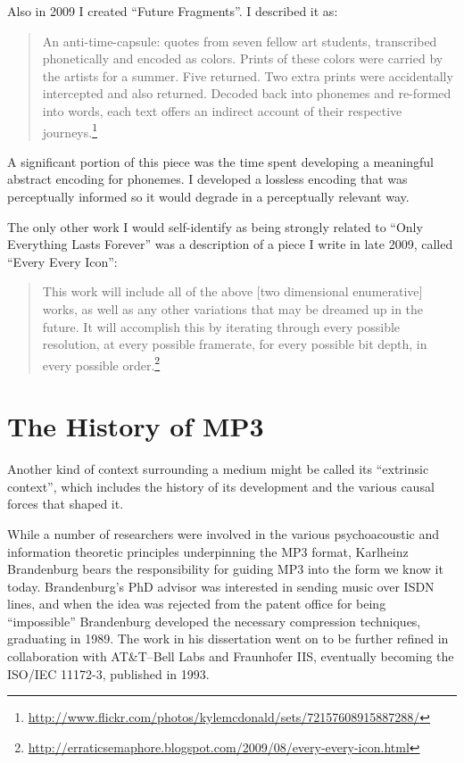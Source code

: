 \documentclass{thesis}
\begin{document}
Also in 2009 I created ``Future Fragments''. I described it as:
	
	\begin{quote}
	An anti-time-capsule: quotes from seven fellow art students, transcribed phonetically and encoded as colors. Prints of these colors were carried by the artists for a summer. Five returned. Two extra prints were accidentally intercepted and also returned. Decoded back into phonemes and re-formed into words, each text offers an indirect account of their respective journeys.\footnote{\url{http://www.flickr.com/photos/kylemcdonald/sets/72157608915887288/}}
	\end{quote}

A significant portion of this piece was the time spent developing a meaningful abstract encoding for phonemes. I developed a lossless encoding that was perceptually informed so it would degrade in a perceptually relevant way.

The only other work I would self-identify as being strongly related to ``Only Everything Lasts Forever'' was a description of a piece I write in late 2009, called ``Every Every Icon'':
	
	\begin{quote}
	This work will include all of the above [two dimensional enumerative] works, as well as any other variations that may be dreamed up in the future. It will accomplish this by iterating through every possible resolution, at every possible framerate, for every possible bit depth, in every possible order.\footnote{\url{http://erraticsemaphore.blogspot.com/2009/08/every-every-icon.html}}
	\end{quote}	

\section{The History of MP3}

Another kind of context surrounding a medium might be called its ``extrinsic context'', which includes the history of its development and the various causal forces that shaped it.

While a number of researchers were involved in the various psychoacoustic and information theoretic principles underpinning the MP3 format, Karlheinz Brandenburg bears the responsibility for guiding MP3 into the form we know it today. Brandenburg's PhD advisor was interested in sending music over ISDN lines, and when the idea was rejected from the patent office for being ``impossible'' Brandenburg developed the necessary compression techniques, graduating in 1989\cite{brandenburg_interviews_2004}. The work in his dissertation went on to be further refined in collaboration with AT\&T--Bell Labs and Fraunhofer IIS, eventually becoming the ISO/IEC 11172-3, published in 1993.
\end{document}
